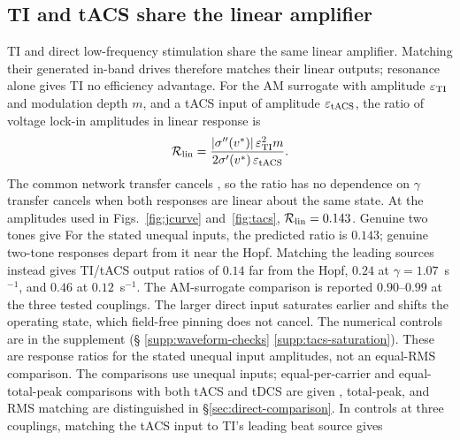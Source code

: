 \documentclass[11pt,a4paper]{article}
\newif\ifjne
\newcommand{\Sig}{\sigma}
\providecommand{\DIFaddtex}[1]{{\protect\color{blue} \sf #1}} %
\providecommand{\DIFdeltex}[1]{{\protect\color{red} \scriptsize #1}} %
\providecommand{\DIFaddbegin}{} %
\providecommand{\DIFaddend}{} %
\providecommand{\DIFdelbegin}{} %
\providecommand{\DIFdelend}{} %
\providecommand{\DIFadd}[1]{\texorpdfstring{\DIFaddtex{#1}}{#1}} %
\providecommand{\DIFdel}[1]{\texorpdfstring{\DIFdeltex{#1}}{}} %
\begin{document}
\subsection{TI and tACS share the linear amplifier}\label{sec:tacs-results}
TI and direct low-frequency stimulation share the same linear amplifier.
Matching their generated in-band drives therefore matches their linear outputs;
resonance alone gives TI no efficiency advantage.
For the AM surrogate with amplitude $\varepsilon_{\rm TI}$ and modulation depth
$m$, and a tACS input of amplitude $\varepsilon_{\rm tACS}$, the ratio of voltage
lock-in amplitudes in linear response is
\[
\mathcal R_{\rm lin}
=\frac{|\Sig''(v^*)|\,\varepsilon_{\rm TI}^2m}{2\Sig'(v^*)\,\varepsilon_{\rm tACS}}.
\]
The common \DIFdelbegin \DIFdel{network transfer cancels , so the ratio has no dependence on $\gamma$
}\DIFdelend \DIFaddbegin \DIFadd{transfer cancels }\DIFaddend when both responses are linear about the same
state. \DIFdelbegin \DIFdel{At the amplitudes used in
Figs.~\ref{fig:jcurve} and~\ref{fig:tacs}, $\mathcal R_{\rm lin}=0.143$. Genuine two tones give }\DIFdelend \DIFaddbegin \DIFadd{For the stated unequal inputs, the predicted ratio is $0.143$;
genuine two-tone responses depart from it near the Hopf. Matching the
leading sources instead gives TI/tACS }\DIFaddend output ratios of \DIFdelbegin \DIFdel{$0.14$ far from the Hopf, $0.24$ at $\gamma=1.07$~s$^{-1}$, and $0.46$ at $0.12$~s$^{-1}$.
The AM-surrogate
comparison is reported }\DIFdelend \DIFaddbegin \DIFadd{$0.90$--$0.99$
at the three tested couplings. The larger direct input saturates earlier
and shifts the operating state, which field-free pinning does not cancel.
The numerical controls are }\DIFaddend in the supplement
(\S\DIFdelbegin \DIFdel{\ref{supp:waveform-checks}}\DIFdelend \DIFaddbegin \DIFadd{\ref{supp:tacs-saturation}}\DIFaddend ). These \DIFdelbegin \DIFdel{are response ratios for the stated unequal input amplitudes, not an
equal-RMS comparison. The }\DIFdelend \DIFaddbegin \DIFadd{comparisons use unequal inputs;
}\DIFaddend equal-per-carrier\DIFdelbegin \DIFdel{and equal-total-peak comparisons
with both tACS and tDCS are given }\DIFdelend \DIFaddbegin \DIFadd{, total-peak, and RMS matching are distinguished }\DIFaddend in
\S\ref{sec:direct-comparison}.
\DIFdelbegin \DIFdel{In controls at three couplings, matching the tACS input
to TI's leading beat source gives }\DIFdelend \DIFaddbegin

\ifjne\else
\end{document}
